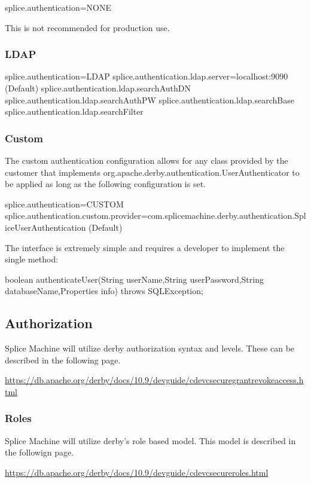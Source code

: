 splice.authentication=NONE

This is not recommended for production use.

\subsubsection{LDAP}

splice.authentication=LDAP
splice.authentication.ldap.server=localhost:9090 (Default)
splice.authentication.ldap.searchAuthDN
splice.authentication.ldap.searchAuthPW
splice.authentication.ldap.searchBase
splice.authentication.ldap.searchFilter

\subsubsection{Custom}

The custom authentication
configuration allows for any
class provided by the customer
that implements org.apache.derby.authentication.UserAuthenticator
to be applied as long as the following configuration is set.

splice.authentication=CUSTOM
splice.authentication.custom.provider=com.splicemachine.derby.authentication.SpliceUserAuthentication
(Default)

The interface is extremely simple and requires a developer to implement the
single method:

boolean	authenticateUser(String userName,String userPassword,String
databaseName,Properties info) throws SQLException;


\subsection{Authorization}

Splice Machine will utilize derby authorization syntax and levels.  These can be
described in the following page.

\url{https://db.apache.org/derby/docs/10.9/devguide/cdevcsecuregrantrevokeaccess.html}

\subsubsection{Roles}

Splice Machine will utilize derby's role based model.  This model is described
in the followign page.

\url{https://db.apache.org/derby/docs/10.9/devguide/cdevcsecureroles.html}

